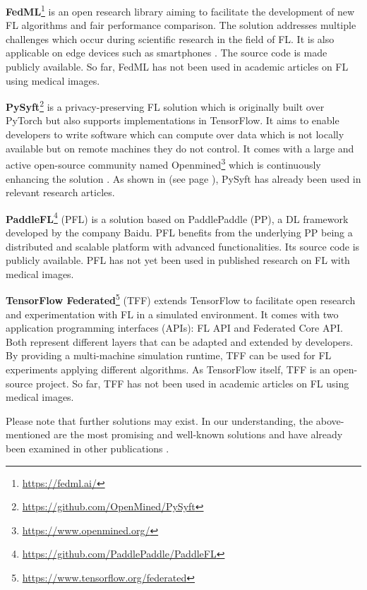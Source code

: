 \textbf{FedML}\footnote{\url{https://fedml.ai/}}
is an open research library aiming to facilitate the development of new FL algorithms and fair performance comparison. The solution addresses multiple challenges which occur during scientific research in the field of FL. It is also applicable on edge devices such as smartphones \citep{He2020FedML:Learning}.
The source code is made publicly available.
So far, FedML has not been used in academic articles on FL using medical images.

\textbf{PySyft}\footnote{\url{https://github.com/OpenMined/PySyft}}
is a privacy-preserving FL solution which is originally built over PyTorch but also supports implementations in TensorFlow. It aims to enable developers to write software which can compute over data which is not locally available but on remote machines they do not control. It comes with a large and active open-source community named Openmined\footnote{\url{https://www.openmined.org/}} which is continuously enhancing the solution \citep{Ryffel2018ALearning}. As shown in  (see page \pageref{subsec:LitRev}), PySyft has already been used in relevant research articles.

\textbf{PaddleFL}\footnote{\url{https://github.com/PaddlePaddle/PaddleFL}}
(PFL) is a solution based on PaddlePaddle (PP), a DL framework developed by the company Baidu. PFL benefits from the underlying PP being a distributed and scalable platform with advanced functionalities.
Its source code is publicly available.
PFL has not yet been used in published research on FL with medical images.

\textbf{TensorFlow Federated}\footnote{\url{https://www.tensorflow.org/federated}}
(TFF) extends TensorFlow to facilitate open research and experimentation with FL in a simulated environment. It comes with two application programming interfaces (APIs): FL API and Federated Core API. Both represent different layers that can be adapted and extended by developers. By providing a multi-machine simulation runtime, TFF can be used for FL experiments applying different algorithms. As TensorFlow itself, TFF is an open-source project. So far, TFF has not been used in academic articles on FL using medical images.

Please note that further solutions may exist. In our understanding, the above-mentioned are the most promising and well-known solutions and have already been examined in other publications \citep{Li2019AProtection, He2020FedML:Learning}.



